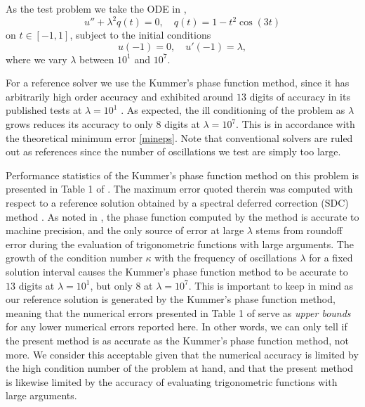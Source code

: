 \documentclass[10pt]{article}
\newcommand{\be}{\begin{equation}}
\newcommand{\ee}{\end{equation}}
\begin{document}
As the test problem we take the ODE in \cite[Eq.~(237)]{bremer2018},
\be\label{bremer237eq}
u'' + \lambda^2 q(t) = 0, \quad q(t) = 1 - t^2\cos(3t)
\ee
on $t \in [-1, 1]$, subject to the initial conditions
\be\label{bremer237ic}
u(-1) = 0, \quad u'(-1) = \lambda,
\ee
where we vary $\lambda$ between $10^1$ and $10^7$.

%
For a reference solver we 
use the Kummer's phase function method, since it has arbitrarily high
order accuracy and exhibited around $13$ digits of accuracy
in its published tests at $\lambda = 10^1$ \cite[Table~1]{bremer2018}.
As expected,
the ill conditioning of the problem as $\lambda$
grows
reduces its accuracy to only $8$ digits at $\lambda = 10^7$.
This is in accordance with the theoretical minimum error \eqref{mineps}.
Note that conventional solvers are ruled out as references since
the number of oscillations we test are simply too large.

Performance statistics of the Kummer's phase function method on this problem is presented in
Table 1 of \cite{bremer2018}. The maximum error quoted therein was computed
with respect to a reference solution obtained by a spectral deferred correction
(SDC) method \cite{dutt2000}. As noted in \cite{bremer2018}, the phase function
computed by the method is accurate to machine precision, and the only source of
error at large $\lambda$ stems from roundoff error during the evaluation of
trigonometric functions with large arguments. The growth of the condition number $\kappa$ with the frequency of oscillations $\lambda$ for a fixed solution interval causes the Kummer's phase function method to
be accurate to $13$ digits at $\lambda = 10^1$, but only $8$  at $\lambda =
10^7$. This is important to keep in mind as our reference solution is generated
by the Kummer's phase function method, meaning that the numerical errors presented in Table
1 of \cite{bremer2018} serve as \emph{upper bounds} for any lower numerical
errors reported here. In other words, we can only tell if the present method is
as accurate as the Kummer's phase function method, not more. We consider this acceptable
given that the numerical accuracy is limited by the high condition number of
the problem at hand, and that the present method is likewise limited by
the accuracy of evaluating trigonometric functions with large arguments.
\end{document}
